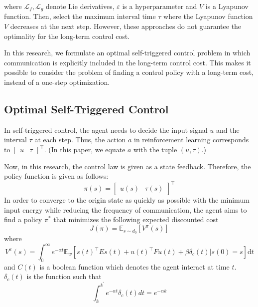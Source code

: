 \documentclass[english, dvipdfmx]{ampmt}             %
\newcommand{\expect}{\mathbb{E}}
\begin{document}
where $\mathcal{L}_f, \mathcal{L}_g$ denote Lie derivatives, $\varepsilon$ is a hyperparameter and $V$ is a Lyapunov function. Then, select the maximum interval time $\tau$ where the Lyapunov function $V$ decreases at the next step. However, these approaches do not guarantee the optimality for the long-term control cost. \par
In this research, we formulate an optimal self-triggered control problem in which communication is explicitly included in the long-term control cost. This makes it possible to consider the problem of finding a control policy with a long-term cost, instead of a one-step optimization.

\subsection{Optimal Self-Triggered Control}
\label{sec:formulation}
In self-triggered control, the agent needs to decide the input signal $u$ and the interval $\tau$ at each step. Thus, the action $a$ in reinforcement learning corresponds to $\begin{bmatrix}u & \tau \end{bmatrix}^{\top}$. (In this paper, we equate $a$ with the tuple $(u,\tau)$.) \par
Now, in this research, the control law is given as a state feedback. Therefore, the policy function is given as follows:
\begin{equation}
	\pi(s) = \begin{bmatrix}u(s) & \tau(s)\end{bmatrix}^{\top}
\end{equation}
In order to converge to the origin state as quickly as possible with the minimum input energy while reducing the frequency of communication, the agent aims to find a policy $\pi^{*}$ that minimizes the following expected discounted cost 
\begin{equation}
	J(\pi)=\expect_{s\sim d_0}[V^{\pi}(s)] \label{evaluation}
\end{equation}
where
\begin{equation}
	V^{\pi}(s) = \int_{0}^{\infty} e^{-\alpha t}\expect_{w}[s(t)^{\top}Es(t)+u(t)^{\top}Fu(t)+\beta \delta_c(t)|s(0)=s]\textrm{d}t \label{such_that}
\end{equation}
and $C(t)$ is a boolean function which denotes the agent interact at time $t$. $\delta_c(t)$ is the function such that
\begin{equation}
	\int_{k}^{k^{\prime}}e^{-\alpha t}\delta_c(t)dt=e^{-\alpha k}
\end{equation} 
\end{document}
